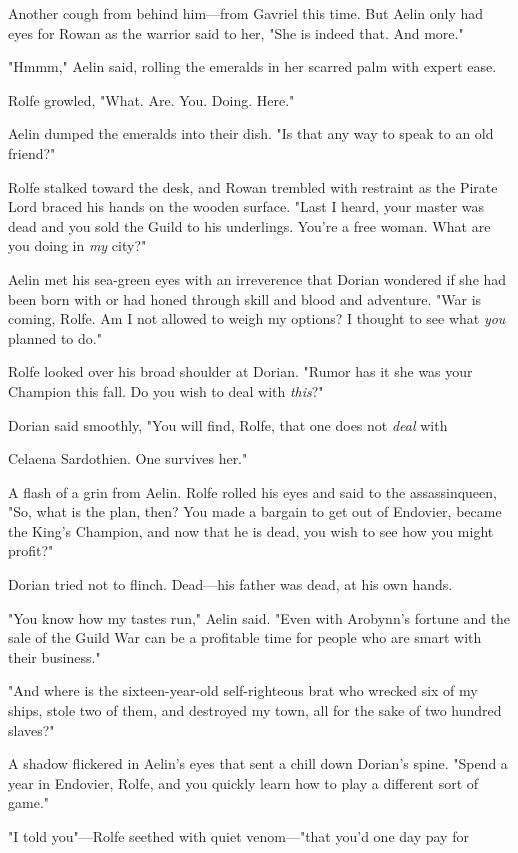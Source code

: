 Another cough from behind him---from Gavriel this time. But Aelin only had eyes for Rowan as the warrior said to her, "She is indeed that. And more."

"Hmmm," Aelin said, rolling the emeralds in her scarred palm with expert ease.

Rolfe growled, "What. Are. You. Doing. Here."

Aelin dumped the emeralds into their dish. "Is that any way to speak to an old friend?"

Rolfe stalked toward the desk, and Rowan trembled with restraint as the Pirate Lord braced his hands on the wooden surface. "Last I heard, your master was dead and you sold the Guild to his underlings. You're a free woman. What are you doing in \emph{my} city?"

Aelin met his sea-green eyes with an irreverence that Dorian wondered if she had been born with or had honed through skill and blood and adventure. "War is coming, Rolfe. Am I not allowed to weigh my options? I thought to see what \emph{you} planned to do."

Rolfe looked over his broad shoulder at Dorian. "Rumor has it she was your Champion this fall. Do you wish to deal with \emph{this}?"

Dorian said smoothly, "You will find, Rolfe, that one does not
\emph{deal} with

Celaena Sardothien. One survives her."

A flash of a grin from Aelin. Rolfe rolled his eyes and said to the assassinqueen, "So, what is the plan, then? You made a bargain to get out of Endovier, became the King's Champion, and now that he is dead, you wish to see how you might profit?"

Dorian tried not to flinch. Dead---his father was dead, at his own hands.

"You know how my tastes run," Aelin said. "Even with Arobynn's fortune and the sale of the Guild  War can be a profitable time for people who are smart with their business."

"And where is the sixteen-year-old self-righteous brat who wrecked six of my ships, stole two of them, and destroyed my town, all for the sake of two hundred slaves?"

A shadow flickered in Aelin's eyes that sent a chill down Dorian's spine. "Spend a year in Endovier, Rolfe, and you quickly learn how to play a different sort of game."

"I told you"---Rolfe seethed with quiet venom---"that you'd one day pay for

